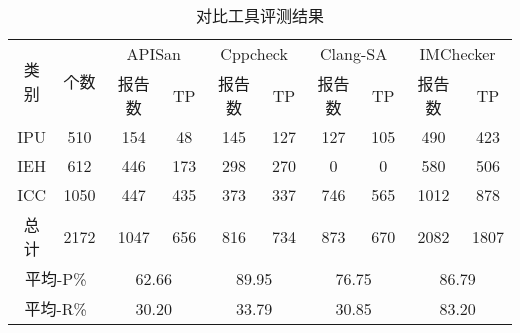 \begin{table}[b]
	\centering
	\begin{minipage}[t]{0.95\linewidth} %
		\caption{对比工具评测结果}
		\label{tab:3-4-other}
		\begin{tabular}{@{\extracolsep{4pt}}cccccccccc@{}}
			\hline
			\multirow{2}{*}{类别 } & \multirow{2}{*}{个数} & \multicolumn{2}{c}{APISan} & \multicolumn{2}{c}{Cppcheck} & \multicolumn{2}{c}{Clang-SA} & \multicolumn{2}{c}{IMChecker}\\
			\cline{3-4} \cline{5-6} \cline{7-8} \cline{9-10}
			 & & 报告数 & TP & 报告数 & TP& 报告数 & TP & 报告数 & TP \\
			 \hline
			 IPU & 510 &  154 & 48 & 145 &127 &127 &105 & 490 & 423\\
			 IEH & 612 &  446 &173& 298& 270& 0& 0& 580& 506 \\
			 ICC & 1050 &  447 &435 &373 &337 &746& 565 &1012 &878 \\
			 总计 & 2172 &   1047& 656& 816& 734& 873& 670& 2082& 1807 \\
			 \multicolumn{2}{c}{平均-P\%} &\multicolumn{2}{c}{62.66}  & \multicolumn{2}{c}{89.95}  &\multicolumn{2}{c}{76.75}  &\multicolumn{2}{c}{86.79} \\
			 \multicolumn{2}{c}{平均-R\%} & \multicolumn{2}{c}{30.20} & \multicolumn{2}{c}{33.79}  &\multicolumn{2}{c}{30.85}  &\multicolumn{2}{c}{83.20}  \\
			\hline
		\end{tabular}
	\end{minipage}
\end{table}